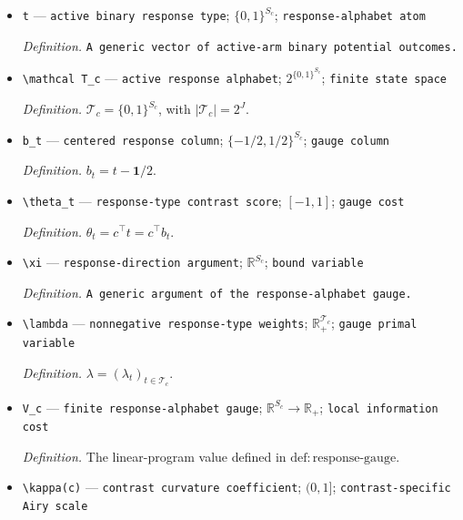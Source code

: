 \documentclass{article}
\begin{document}
\begin{itemize}
  \par\smallskip\noindent\emph{Definition.} \(B=[v,d_1,\ldots,d_{J-1}]\).
  \item \texttt{t} --- \texttt{active binary response type}; \(\{0,1\}^{S_c}\); \texttt{response-\allowbreak{}alphabet atom}
  \par\smallskip\noindent\emph{Definition.} \texttt{A generic vector of active-\allowbreak{}arm binary potential outcomes.}
  \item \texttt{\textbackslash{}\allowbreak{}mathcal T\_\allowbreak{}c} --- \texttt{active response alphabet}; \(2^{\{0,1\}^{S_c}}\); \texttt{finite state space}
  \par\smallskip\noindent\emph{Definition.} \(\mathcal T_c=\{0,1\}^{S_c}\), with \(|\mathcal T_c|=2^J\).
  \item \texttt{b\_\allowbreak{}t} --- \texttt{centered response column}; \(\{-1/2,1/2\}^{S_c}\); \texttt{gauge column}
  \par\smallskip\noindent\emph{Definition.} \(b_t=t-\mathbf 1/2\).
  \item \texttt{\textbackslash{}\allowbreak{}theta\_\allowbreak{}t} --- \texttt{response-\allowbreak{}type contrast score}; \([-1,1]\); \texttt{gauge cost}
  \par\smallskip\noindent\emph{Definition.} \(\theta_t=c^\top t=c^\top b_t\).
  \item \texttt{\textbackslash{}\allowbreak{}xi} --- \texttt{response-\allowbreak{}direction argument}; \(\mathbb R^{S_c}\); \texttt{bound variable}
  \par\smallskip\noindent\emph{Definition.} \texttt{A generic argument of the response-\allowbreak{}alphabet gauge.}
  \item \texttt{\textbackslash{}\allowbreak{}lambda} --- \texttt{nonnegative response-\allowbreak{}type weights}; \(\mathbb R_+^{\mathcal T_c}\); \texttt{gauge primal variable}
  \par\smallskip\noindent\emph{Definition.} \(\lambda=(\lambda_t)_{t\in\mathcal T_c}\).
  \item \texttt{V\_\allowbreak{}c} --- \texttt{finite response-\allowbreak{}alphabet gauge}; \(\mathbb R^{S_c}\to\mathbb R_+\); \texttt{local information cost}
  \par\smallskip\noindent\emph{Definition.} The linear-program value defined in \(\mathrm{def:response\text{-}gauge}\).
  \item \texttt{\textbackslash{}\allowbreak{}kappa(c)} --- \texttt{contrast curvature coefficient}; \((0,1]\); \texttt{contrast-\allowbreak{}specific Airy scale}

\end{itemize}
\end{document}
